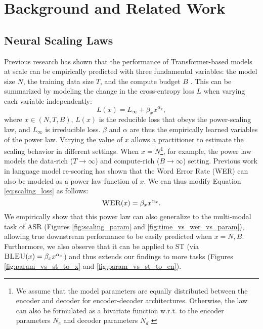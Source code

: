 \section{Background and Related Work}
\subsection{Neural Scaling Laws}
\vspace{-0.2cm}
Previous research has shown that the performance of Transformer-based \cite{transformer} models at scale can be empirically predicted with three fundamental variables: the model size $N$, the training data size $T$, and the compute budget $B$ \cite{hestness2017deep, rosenfeld2020a, kaplan2020scaling, hernandez2021scaling, ghorbani2022scaling, scalingMNMT}. This can be summarized by modeling the change in the cross-entropy loss $L$ when varying each variable independently:
\begin{equation}
    L(x) = L_{\infty} + {\beta_x}{x}^{\alpha_x},
    \label{eq:scaling_loss}
\end{equation}
where $x \in (N, T, B)$, $L(x)$ is the reducible loss that obeys the power-scaling law, and $L_{\infty}$ is irreducible loss. $\beta$ and $\alpha$ are thus the empirically learned variables of the power law. Varying the value of $x$ allows a practitioner to estimate the scaling behavior in different settings. When $x=N$\footnote{We assume that the model parameters are equally distributed between the encoder and decoder for encoder-decoder architectures. Otherwise, the law can also be formulated as a bivariate function w.r.t. to the encoder parameters $N_e$ and decoder parameters $N_d$  \cite{scalingMNMT, ghorbani2022scaling}}, for example, the power law models the data-rich ($T \rightarrow \infty$) and compute-rich ($B \rightarrow \infty$) setting. Previous work \cite{scale_rescore} in language model re-scoring has shown that the Word Error Rate (WER) can also be modeled as a power law function of $x$. We can thus modify Equation \ref{eq:scaling_loss} as follows:
\begin{equation}
    \textsc{WER}(x) = {\beta_x}{x}^{\alpha_x}.
    \label{eq:scaling_wer}
\end{equation}
We empirically show that this power law can also generalize to the multi-modal task of ASR (Figures \ref{fig:scaling_param} and \ref{fig:time_vs_wer_vs_param}), allowing true downstream performance to be easily predicted when $x=N,B$. Furthermore, we also observe that it can be applied to ST (via $\textsc{BLEU}(x) = {\beta_x}{x}^{\alpha_x}$) and thus extends our findings to more tasks (Figures \ref{fig:param_vs_st_to_x} and  \ref{fig:param_vs_st_to_en}). 

